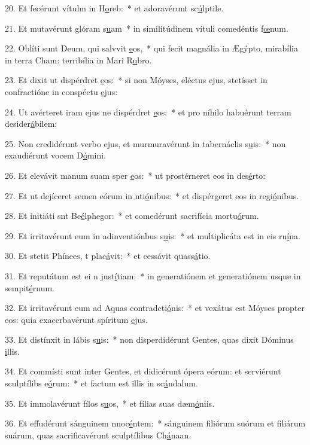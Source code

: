 20. Et fecérunt vítulm in H\uline{o}reb:~* et adoravérunt sc\uline{ú}lptile.\par 
21. Et mutavérunt glóram s\uline{u}am~* in similitúdinem vítuli comedéntis f\uline{œ}num.\par 
22. Oblíti sunt Deum, qui salvvit \uline{e}os,~* qui fecit magnália in Ægýpto, mirabília in terra Cham: terribília in Mari R\uline{u}bro.\par 
23. Et dixit ut dispérdret \uline{e}os:~* si non Móyses, eléctus ejus, stetísset in confractióne in conspéctu \uline{e}jus:\par 
24. Ut avérteret iram ejus ne dispérdret \uline{e}os:~* et pro níhilo habuérunt terram desider\uline{á}bilem:\par 
25. Non credidérunt verbo ejus, et murmuravérunt in tabernáclis s\uline{u}is:~* non exaudiérunt vocem D\uline{ó}mini.\par 
26. Et elevávit manum suam sper \uline{e}os:~* ut prostérneret eos in des\uline{é}rto:\par 
27. Et ut dejíceret semen eórum in nti\uline{ó}nibus:~* et dispérgeret eos in regi\uline{ó}nibus.\par 
28. Et initiáti snt Be\uline{é}lphegor:~* et comedérunt sacrifícia mortu\uline{ó}rum.\par 
29. Et irritavérunt eum in adinventiónbus s\uline{u}is:~* et multiplicáta est in eis ru\uline{í}na.\par 
30. Et stetit Phínees, t plac\uline{á}vit:~* et cessávit quass\uline{á}tio.\par 
31. Et reputátum est ei n just\uline{í}tiam:~* in generatiónem et generatiónem usque in sempit\uline{é}rnum.\par 
32. Et irritavérunt eum ad Aquas contradcti\uline{ó}nis:~* et vexátus est Móyses propter eos: quia exacerbavérunt spíritum \uline{e}jus.\par 
33. Et distínxit in lábis s\uline{u}is:~* non disperdidérunt Gentes, quas dixit Dóminus \uline{i}llis.\par 
34. Et commísti sunt inter Gentes, et didicérunt ópera eórum: et serviérunt sculptílibs e\uline{ó}rum:~* et factum est illis in sc\uline{á}ndalum.\par 
35. Et immolavérunt fílos s\uline{u}os,~* et fílias suas dæm\uline{ó}niis.\par 
36. Et effudérunt sánguinem nnoc\uline{é}ntem:~* sánguinem filiórum suórum et filiárum suárum, quas sacrificavérunt sculptílibus Ch\uline{á}naan.\par 
